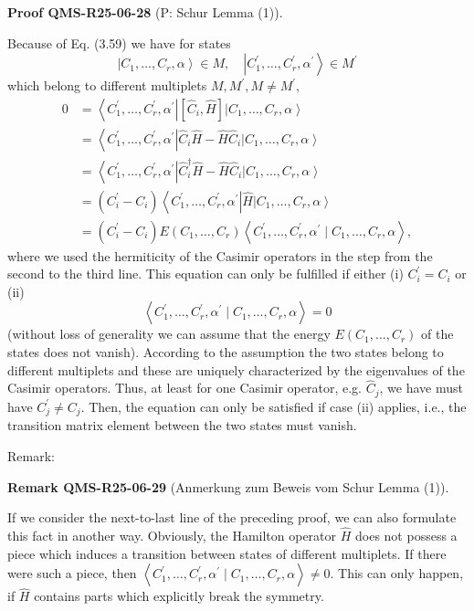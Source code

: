 \documentclass[10pt, letterpaper]{article}
\newcommand{\CustomHeading}[3]{%
  \par\medskip\noindent%
  \textbf{#1 #2} \textnormal{(#3)}.\enskip%
}
\newenvironment{REM}[2]{\begin{unitbox}\CustomHeading{Remark}{#1}{#2}}{\end{unitbox}}
\newenvironment{PROOF}[2]{\begin{unitbox}\CustomHeading{Proof}{#1}{#2}}{\end{unitbox}}
\begin{document}
\begin{PROOF}{QMS-R25-06-28}{P: Schur Lemma (1)}
Because of Eq. (3.59) we have for states
$$
\left|C_{1}, \ldots, C_{r}, \alpha\right\rangle \in M, \quad\left|C_{1}^{\prime}, \ldots, C_{r}^{\prime}, \alpha^{\prime}\right\rangle \in M^{\prime}
$$
which belong to different multiplets $M, M^{\prime}, M \neq M^{\prime}$,
$$
\begin{aligned}
0 & =\left\langle C_{1}^{\prime}, \ldots, C_{r}^{\prime}, \alpha^{\prime}\right|\left[\hat{C}_{i}, \hat{H}\right]\left|C_{1}, \ldots, C_{r}, \alpha\right\rangle \\
& =\left\langle C_{1}^{\prime}, \ldots, C_{r}^{\prime}, \alpha^{\prime}\right| \hat{C}_{i} \hat{H}-\hat{H} \hat{C}_{i}\left|C_{1}, \ldots, C_{r}, \alpha\right\rangle \\
& =\left\langle C_{1}^{\prime}, \ldots, C_{r}^{\prime}, \alpha^{\prime}\right| \hat{C}_{i}^{\dagger} \hat{H}-\hat{H} \hat{C}_{i}\left|C_{1}, \ldots, C_{r}, \alpha\right\rangle \\
& =\left(C_{i}^{\prime}-C_{i}\right)\left\langle C_{1}^{\prime}, \ldots, C_{r}^{\prime}, \alpha^{\prime}\right| \hat{H}\left|C_{1}, \ldots, C_{r}, \alpha\right\rangle \\
& =\left(C_{i}^{\prime}-C_{i}\right) E\left(C_{1}, \ldots, C_{r}\right)\left\langle C_{1}^{\prime}, \ldots, C_{r}^{\prime}, \alpha^{\prime} \mid C_{1}, \ldots, C_{r}, \alpha\right\rangle,
\end{aligned}
$$
where we used the hermiticity of the Casimir operators in the step from the second to the third line. This equation can only be fulfilled if either (i) $C_{i}^{\prime}=C_{i}$ or (ii)
$$
\left\langle C_{1}^{\prime}, \ldots, C_{r}^{\prime}, \alpha^{\prime} \mid C_{1}, \ldots, C_{r}, \alpha\right\rangle=0
$$
(without loss of generality we can assume that the energy $E\left(C_{1}, \ldots, C_{r}\right)$ of the states does not vanish). According to the assumption the two states belong to different multiplets and these are uniquely characterized by the eigenvalues of the Casimir operators. Thus, at least for one Casimir operator, e.g. $\hat{C}_{j}$, we have must have $C_{j}^{\prime} \neq C_{j}$. Then, the equation can only be satisfied if case (ii) applies, i.e., the transition matrix element between the two states must vanish.
\end{PROOF}





Remark: 


\begin{REM}{QMS-R25-06-29}{Anmerkung zum Beweis vom Schur Lemma (1)}
If we consider the next-to-last line of the preceding proof, we can also formulate this fact in another way. Obviously, the Hamilton operator $\hat{H}$ does not possess a piece which induces a transition between states of different multiplets. If there were such a piece, then $\left\langle C_{1}^{\prime}, \ldots, C_{r}^{\prime}, \alpha^{\prime} \mid C_{1}, \ldots, C_{r}, \alpha\right\rangle \neq 0$. This can only happen, if $\hat{H}$ contains parts which explicitly break the symmetry.
\end{REM}
\end{document}
